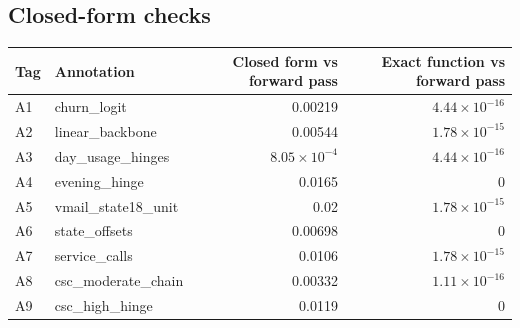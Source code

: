 \begin{drafted}
\subsection{Closed-form checks}\label{app:churn100-s4-c2:closedform}
{\small\noindent\begin{tabularx}{\linewidth}{@{}lXrr@{}}
\toprule Tag & Annotation & Closed form vs forward pass & Exact function vs forward pass \\ \midrule
A1 & churn\_\allowbreak{}logit & 0.00219 & $4.44\times 10^{-16}$ \\
A2 & linear\_\allowbreak{}backbone & 0.00544 & $1.78\times 10^{-15}$ \\
A3 & day\_\allowbreak{}usage\_\allowbreak{}hinges & $8.05\times 10^{-4}$ & $4.44\times 10^{-16}$ \\
A4 & evening\_\allowbreak{}hinge & 0.0165 & 0 \\
A5 & vmail\_\allowbreak{}state18\_\allowbreak{}unit & 0.02 & $1.78\times 10^{-15}$ \\
A6 & state\_\allowbreak{}offsets & 0.00698 & 0 \\
A7 & service\_\allowbreak{}calls & 0.0106 & $1.78\times 10^{-15}$ \\
A8 & csc\_\allowbreak{}moderate\_\allowbreak{}chain & 0.00332 & $1.11\times 10^{-16}$ \\
A9 & csc\_\allowbreak{}high\_\allowbreak{}hinge & 0.0119 & 0 \\
\bottomrule
\end{tabularx}\par}

\end{drafted}
